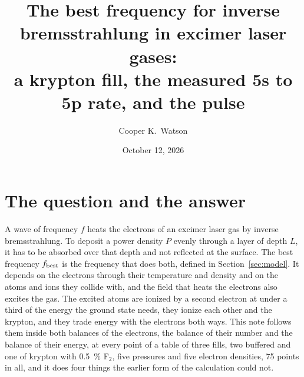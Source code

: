\documentclass[11pt]{article}
\title{The best frequency for inverse bremsstrahlung in excimer laser gases:\\ a krypton fill, the measured 5s to 5p rate, and the pulse}
\author{Cooper K.\ Watson}
\date{October 12, 2026}
\begin{document}
\maketitle

\section{The question and the answer}
\label{sec:answer}

A wave of frequency $f$ heats the electrons of an excimer laser gas by inverse bremsstrahlung. To deposit a power
density $P$ evenly through a layer of depth $L$, it has to be absorbed over that depth and not reflected at the
surface. The best frequency $f_{\rm best}$ is the frequency that does both, defined in Section~\ref{sec:model}. It
depends on the electrons through their temperature and density and on the atoms and ions they collide with, and
the field that heats the electrons also excites the gas. The excited atoms are ionized by a second electron at
under a third of the energy the ground state needs, they ionize each other and the krypton, and they trade energy
with the electrons both ways. This note follows them inside both balances of the electrons, the balance of their
number and the balance of their energy, at every point of a table of three fills, two buffered and one of krypton
with 0.5~\% F$_2$, five pressures and five electron densities, 75 points in all, and it does four things the
earlier form of the calculation could not.
\end{document}
